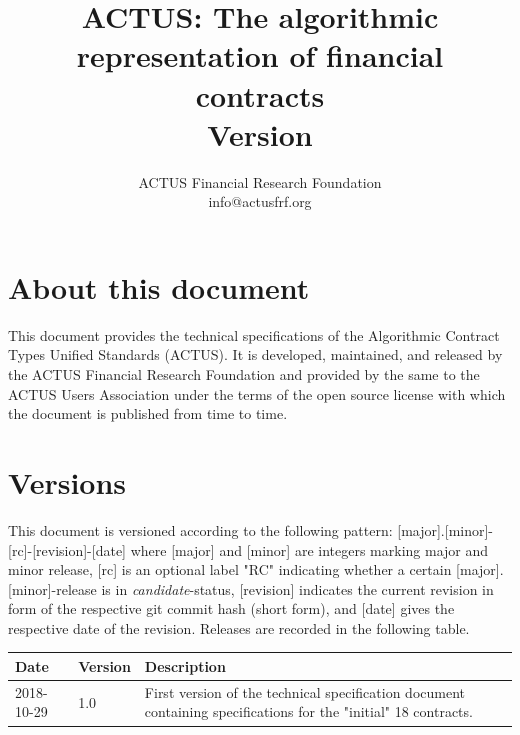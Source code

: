 \documentclass[9pt,oneside]{amsart}
\title{ACTUS: The algorithmic representation of financial contracts \\
      {\smaller \textbf{Version \VersionNumber}}}
\author{
    ACTUS Financial Research Foundation\\
    info@actusfrf.org
}
\begin{document}
%

\maketitle


\section*{About this document}\label{sec:about}

This document provides the technical specifications of the Algorithmic Contract Types Unified Standards (ACTUS). It is developed, maintained, and released by the ACTUS Financial Research Foundation and provided by the same to the ACTUS Users Association under the terms of the open source license with which the document is published from time to time.


\section*{Versions}\label{sec:version}

This document is versioned according to the following pattern: [major].[minor]-[rc]-[revision]-[date] where [major] and [minor] are integers marking major and minor release, [rc] is an optional label "RC" indicating whether a certain [major].[minor]-release is in \textit{candidate}-status, [revision] indicates the current revision in form of the respective git commit hash (short form), and [date] gives the respective date of the revision. Releases are recorded in the following table.

\begin{table}[H]
  \centering
  \begin{tabular}{| p{} | p{} | p{} |}
  \hline
  Date & Version & Description \\ 
  \hline
  2018-10-29 & 1.0 & First version of the technical specification document containing specifications for the "initial" 18 contracts.\\
  \hline
  \end{tabular}
\end{table}


\end{document}

